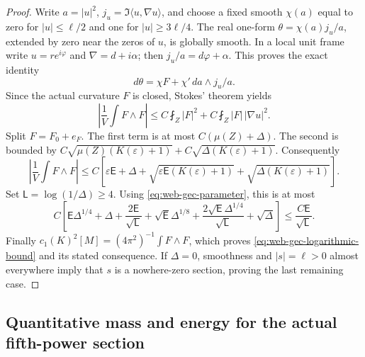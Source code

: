 \begin{proof}
Write \(a=|u|^2\), \(j_u=\Im\langle u,\nabla u\rangle\), and
choose a fixed smooth \(\chi(a)\) equal to zero for \(|u|\le\ell/2\)
and one for \(|u|\ge3\ell/4\).  The real one-form
\(\theta=\chi(a)j_u/a\), extended by zero near the zeros of \(u\),
is globally smooth.  In a local unit frame write
\(u=re^{i\varphi}\) and \(\nabla=d+i\alpha\); then
\(j_u/a=d\varphi+\alpha\).  This proves the exact identity
\[
 d\theta=\chi F+\chi'\,da\wedge j_u/a.
\]
Since the actual curvature \(F\) is closed, Stokes' theorem yields
\begin{equation}
 \left|\frac1V\int F\wedge F\right|
 \le C\fint_Z|F|^2+C\fint_Z|F|\,|\nabla u|^2.
 \label{eq:web-gec-chern-cutoff}
\end{equation}
Split \(F=F_0+e_F\).  The first term is at most
\(C(\mu(Z)+\Delta)\).  The second is bounded by
\(C\sqrt{\mu(Z)(K(\varepsilon)+1)}
 +C\sqrt{\Delta(K(\varepsilon)+1)}\).  Consequently
\[
 \left|\frac1V\int F\wedge F\right|
 \le C\left[\varepsilon\mathsf E+\Delta
   +\sqrt{\varepsilon\mathsf E(K(\varepsilon)+1)}
   +\sqrt{\Delta(K(\varepsilon)+1)}\right].
\]
Set \(\mathsf L=\log(1/\Delta)\ge4\).  Using
\eqref{eq:web-gec-parameter}, this is at most
\[
 C\left[\mathsf E\Delta^{1/4}+\Delta
       +\frac{2\mathsf E}{\sqrt{\mathsf L}}
       +\sqrt{\mathsf E}\Delta^{1/8}
       +\frac{2\sqrt{\mathsf E}\Delta^{1/4}}{\sqrt{\mathsf L}}
       +\sqrt\Delta\right]
 \le\frac{C\mathsf E}{\sqrt{\mathsf L}}.
\]
Finally \(c_1(K)^2[M]=(4\pi^2)^{-1}\int F\wedge F\), which proves
\eqref{eq:web-gec-logarithmic-bound} and its stated consequence.  If
\(\Delta=0\), smoothness and \(|s|=\ell>0\) almost everywhere imply
that \(s\) is a nowhere-zero section, proving the last remaining case.
\end{proof}

\subsection{Quantitative mass and energy for the actual fifth-power section}


